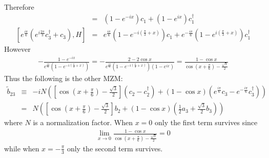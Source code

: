 Therefore
\begin{eqnarray}
	[c_2 - c_2^\dag, H] &=& (1-e^{-ix})c_1 + (1-e^{ix})c_1^\dag\\\nonumber
	[e^{\frac{i\pi}{6}}\left(e^{i\frac{2\pi}{3}} c_3^\dag + c_3\right), H] & = &  e^{\frac{i\pi}{6}} (1-e^{-i\left(\frac{\pi}{3} + x\right)})c_1 + e^{-\frac{i\pi}{6}}( 1- e^{i\left(\frac{\pi}{3} + x\right)})c_1^\dag
\end{eqnarray}
However
\begin{eqnarray}
-\frac{1-e^{-ix}}{e^{\frac{i\pi}{6}} (1-e^{-i\left(\frac{\pi}{3} + x\right)})} = - \frac{2-2\cos x}{e^{\frac{i\pi}{6}} (1-e^{-i\left(\frac{\pi}{3} + x\right)})(1-e^{ix})} = \frac{1-\cos x}{\cos\left( x+ \frac{\pi}{6}\right)-\frac{\sqrt{3}}{2}}
\end{eqnarray}
Thus the following is the other MZM:
\begin{eqnarray}
	\tilde{b}_{23} &\equiv& -iN\left(\left[\cos\left( x+ \frac{\pi}{6}\right)-\frac{\sqrt{3}}{2}\right](c_2 - c_2^\dag) + (1-\cos x) \left( e^{\frac{i\pi}{6}} c_3 -e^{-\frac{i\pi}{6}} c_3^\dag\right)\right)\\\nonumber
	&=& N\left(\left[\cos\left( x+ \frac{\pi}{6}\right)-\frac{\sqrt{3}}{2}\right]b_2 + (1-\cos x)\left( \frac{1}{2} a_3 + \frac{\sqrt{3}}{2} b_3\right)\right)
\end{eqnarray}
where $N$ is a normalization factor. When $x=0$ only the first term survives since
\begin{eqnarray}
\lim_{x\rightarrow 0} \frac{1-\cos x}{\cos\left( x+ \frac{\pi}{6}\right)-\frac{\sqrt{3}}{2}} = 0
\end{eqnarray}
while when $x = -\frac{\pi}{3}$ only the second term survives.





%
